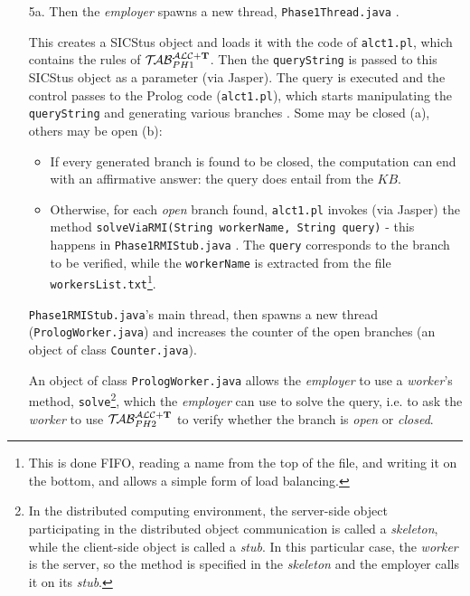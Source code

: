 \documentclass[a4paper, 11pt, oneside]{duthesis}
\newcommand*\circled[1]{\tikz[baseline=(char.base)]{
            \node[shape=circle,draw,inner sep=2pt] (char) {#1};}}
\newcommand{\tip}{{\bf T}}
\newcommand{\primo}{\mathrel{{\mathcal{T}\!\mathcal{AB}}}_{PH 1}^{\mathcal{ALC}+\mbox{\scriptsize $\tip$}}}
\newcommand{\secondo}{\mathrel{{\mathcal{T}\!\mathcal{AB}}}_{PH 2}^{\mathcal{ALC}+\mbox{\scriptsize $\tip$}}}
\begin{document}
\begin{enumerate}

\item[5a.] Then the \emph{employer} spawns a new thread, \texttt{Phase1Thread.java} \circled{1}.

This creates a SICStus object and loads it with the code of \texttt{alct1.pl}, which contains the rules of $\primo$. Then the \texttt{queryString} is passed \circled{2} to this SICStus object as a parameter (via Jasper). The query is executed and the control passes to the Prolog code (\texttt{alct1.pl}), which starts manipulating the \texttt{queryString} and generating various branches \circled{3}. Some may be closed (a), others may be open (b):
	\begin{itemize}
	\item If every generated branch is found to be closed, the computation can end with an affirmative answer: the query does entail from the $KB$.
	\item Otherwise, for each \emph{open} branch found, \texttt{alct1.pl} invokes (via Jasper) the method \texttt{solveViaRMI(String workerName, String query)} - this happens in  \texttt{Phase1RMIStub.java} \circled{4}. The \texttt{query} corresponds to the branch to be verified, while the \texttt{workerName} is extracted from the file \texttt{workersList.txt}\footnote{This is done FIFO, reading a name from the top of the file, and writing it on the bottom, and allows a simple form of load balancing.}.
	\end{itemize}
	
\texttt{Phase1RMIStub.java}'s main thread, then \circled{5} spawns a new thread (\texttt{PrologWorker.java}) and \circled{6} increases the counter of the open branches (an object of class \texttt{Counter.java}).

An object of class \texttt{PrologWorker.java} allows the \emph{employer} to use a \emph{worker}'s method, \texttt{solve}\footnote{In the distributed computing environment, the server-side object participating in the distributed object communication is called a \emph{skeleton}, while the client-side object is called a \emph{stub}. In this particular case, the \emph{worker} is the server, so the method is specified in the \emph{skeleton} and the employer calls it on its \emph{stub}.}, which the \emph{employer} can use to solve the query, i.e. to ask the \emph{worker} to use $\secondo$ to verify whether the branch is \emph{open} or \emph{closed}.


\end{enumerate}
\end{document}
